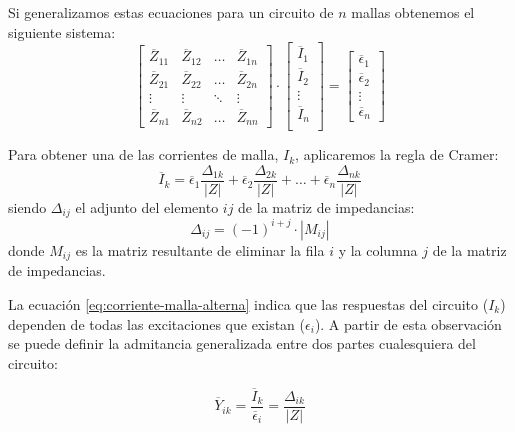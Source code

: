 Si generalizamos estas ecuaciones para un circuito de $n$ mallas
obtenemos el siguiente sistema:
\begin{equation}
  \begin{bmatrix}
    \overline{Z}_{11} & \overline{Z}_{12} & \dots & \overline{Z}_{1n} \\
    \overline{Z}_{21} & \overline{Z}_{22} & \dots & \overline{Z}_{2n} \\
    \vdots & \vdots & \ddots & \vdots \\
    \overline{Z}_{n1} & \overline{Z}_{n2} &  \dots & \overline{Z}_{nn}
  \end{bmatrix} \cdot %
  \begin{bmatrix}
    \overline{I}_1\\
    \overline{I}_2\\
    \vdots \\
    \overline{I}_n\\
  \end{bmatrix} = %
  \begin{bmatrix}
    \overline{\epsilon}_1\\
    \overline{\epsilon}_2\\
    \vdots \\
    \overline{\epsilon}_n
  \end{bmatrix}
\end{equation}

Para obtener una de las corrientes de malla, $I_k$, aplicaremos la
regla de Cramer:
\begin{equation}
  \label{eq:corriente-malla-alterna}
  \overline{I}_k = \overline{\epsilon}_1 \frac{\Delta_{1k}}{|Z|} + \overline{\epsilon}_2 \frac{\Delta_{2k}}{|Z|} + \dots + \overline{\epsilon}_n \frac{\Delta_{nk}}{|Z|}
\end{equation}
siendo \(\Delta_{ij}\) el adjunto del elemento \(ij\) de la matriz de
impedancias:
\[
  \Delta_{ij} = (-1)^{i+j} \cdot |M_{ij}|
\]
donde \(M_{ij}\) es la matriz resultante de eliminar la fila \(i\) y
la columna \(j\) de la matriz de impedancias.

La ecuación \ref{eq:corriente-malla-alterna} indica que las respuestas
del circuito (\(I_k\)) dependen de todas las excitaciones que existan
(\(\epsilon_i\)). A partir de esta observación se puede definir la
admitancia generalizada entre dos partes cualesquiera del circuito:

\begin{equation}
  \label{eq:admitancia-generalizada}
  \overline{Y}_{ik} = \frac{\overline{I}_k}{\overline{\epsilon}_i} = \frac{\Delta_{ik}}{|Z|}
\end{equation}

